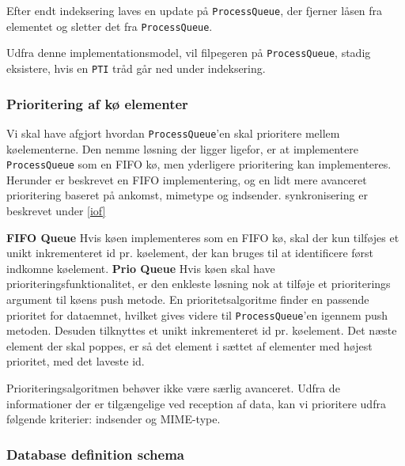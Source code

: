 \documentclass{article}
\begin{document}
\begin{itemize}
\begin{itemize}
    Efter endt indeksering laves en update på
    \texttt{ProcessQueue}, der fjerner låsen fra elementet og sletter
    det fra \texttt{ProcessQueue}.

  \end{itemize}

Udfra denne implementationsmodel, vil filpegeren på
\texttt{ProcessQueue}, stadig eksistere, hvis en \texttt{PTI} tråd går
ned under indeksering.

\end{itemize}

\subsubsection{Prioritering af kø elementer}

Vi skal have afgjort hvordan \texttt{ProcessQueue}'en skal prioritere mellem køelementerne. 
Den nemme løsning der ligger ligefor, er at implementere \texttt{ProcessQueue} som en FIFO kø, men yderligere prioritering kan implementeres. Herunder er beskrevet en FIFO implementering, og en lidt mere avanceret prioritering baseret på ankomst, mimetype og indsender. synkronisering er beskrevet under \ref{iof}

\textbf{FIFO Queue}
Hvis køen implementeres som en FIFO kø, skal der kun tilføjes et unikt inkrementeret id pr. køelement, der kan bruges til at identificere først indkomne køelement. 
\textbf{Prio Queue}
Hvis køen skal have prioriteringsfunktionalitet, er den enkleste løsning nok at tilføje et prioriterings argument til køens push metode. 
En prioritetsalgoritme finder en passende prioritet for dataemnet, hvilket gives videre til \texttt{ProcessQueue}'en igennem push metoden. Desuden tilknyttes et unikt inkrementeret id pr. køelement. Det næste element der skal poppes, er så det element i sættet af elementer med højest prioritet, med det laveste id.

Prioriteringsalgoritmen behøver ikke være særlig avanceret. Udfra de informationer der er tilgængelige ved reception af data, kan vi prioritere udfra følgende kriterier: indsender og MIME-type. 

\subsubsection{Database definition schema}

\begin{verbatim}




\end{verbatim}
\end{document}
